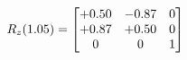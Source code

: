 \documentclass[preview]{standalone}
\begin{document}
\begin{align*}
\special{dvisvgm:raw <g id='unique000'>}R_{z}(1.05) = \begin{bmatrix}+0.50 & -0.87 & 0 \\+0.87 & +0.50 & 0 \\0 & 0 & 1\end{bmatrix}\special{dvisvgm:raw </g>}
\end{align*}
\end{document}
